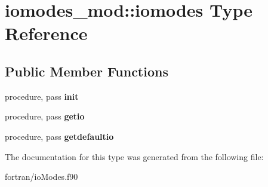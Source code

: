 \hypertarget{structiomodes__mod_1_1iomodes}{}\section{iomodes\+\_\+mod\+:\+:iomodes Type Reference}
\label{structiomodes__mod_1_1iomodes}
\subsection*{Public Member Functions}
\begin{DoxyCompactItemize}
\item 
\mbox{\label{structiomodes__mod_1_1iomodes_ab5fb548a37d22f6f742b3de71a122c5e}} 
procedure, pass {\bfseries init}
\item 
\mbox{\label{structiomodes__mod_1_1iomodes_a74a046f4ca972a9021d00b239a2140de}} 
procedure, pass {\bfseries getio}
\item 
\mbox{\label{structiomodes__mod_1_1iomodes_a995c793057d3726948771bd4e57c7c91}} 
procedure, pass {\bfseries getdefaultio}
\end{DoxyCompactItemize}


The documentation for this type was generated from the following file\+:\begin{DoxyCompactItemize}
\item 
fortran/io\+Modes.\+f90\end{DoxyCompactItemize}
